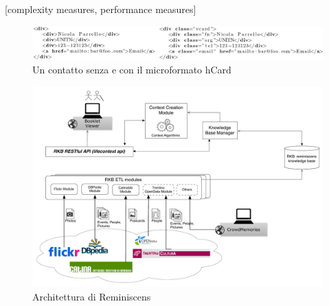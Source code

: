 \documentclass{acm_proc_article-sp}
\begin{document}
[complexity measures, performance measures]





\begin{figure}[t]
\centering
\includegraphics[width=1.0\textwidth]{microformats.pdf}
\caption{Un contatto senza e con il microformato hCard}
\end{figure}





\begin{figure}[t]
\centering
\includegraphics[width=1.0\textwidth]{architecture.pdf}
\caption{Architettura di Reminiscens}
\end{figure}


\end{document}
